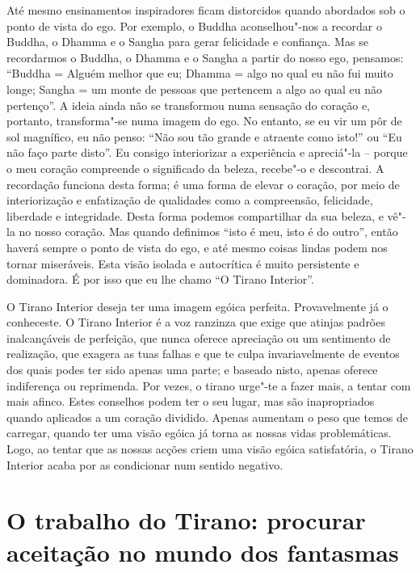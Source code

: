\sectionBreak

Até mesmo ensinamentos inspiradores ficam distorcidos quando abordados
sob o ponto de vista do ego. Por exemplo, o Buddha aconselhou"-nos a
recordar o Buddha, o Dhamma e o Sangha para gerar felicidade e
confiança. Mas se recordarmos o Buddha, o Dhamma e o Sangha a partir do
nosso ego, pensamos: “Buddha = Alguém melhor que eu; Dhamma = algo no
qual eu não fui muito longe; Sangha = um monte de pessoas que pertencem
a algo ao qual eu não pertenço”. A ideia ainda não se transformou numa
sensação do coração e, portanto, transforma"-se numa imagem do ego. No
entanto, se eu vir um pôr de sol magnífico, eu não penso: “Não sou tão
grande e atraente como isto!” ou “Eu não faço parte disto”. Eu consigo
interiorizar a experiência e apreciá"-la -- porque o meu coração
compreende o significado da beleza, recebe"-o e descontrai. A recordação
funciona desta forma; é uma forma de elevar o coração, por meio de
interiorização e enfatização de qualidades como a compreensão,
felicidade, liberdade e integridade. Desta forma podemos compartilhar da
sua beleza, e vê"-la no nosso coração. Mas quando definimos ``isto é meu,
isto é do outro”, então haverá sempre o ponto de vista do ego, e até
mesmo coisas lindas podem nos tornar miseráveis. Esta visão isolada e
autocrítica é muito persistente e dominadora. É por isso que eu lhe
chamo “O Tirano Interior”.

O Tirano Interior deseja ter uma imagem egóica perfeita. Provavelmente
já o conheceste. O Tirano Interior é a voz ranzinza que exige que
atinjas padrões inalcançáveis de perfeição, que nunca oferece apreciação
ou um sentimento de realização, que exagera as tuas falhas e que te
culpa invariavelmente de eventos dos quais podes ter sido apenas uma
parte; e baseado nisto, apenas oferece indiferença ou reprimenda. Por
vezes, o tirano urge"-te a fazer mais, a tentar com mais afinco. Estes
conselhos podem ter o seu lugar, mas são inapropriados quando aplicados
a um coração dividido. Apenas aumentam o peso que temos de carregar,
quando ter uma visão egóica já torna as nossas vidas problemáticas.
Logo, ao tentar que as nossas acções criem uma visão egóica
satisfatória, o Tirano Interior acaba por as condicionar num sentido
negativo.

\section{O trabalho do Tirano: procurar aceitação no mundo dos fantasmas}


